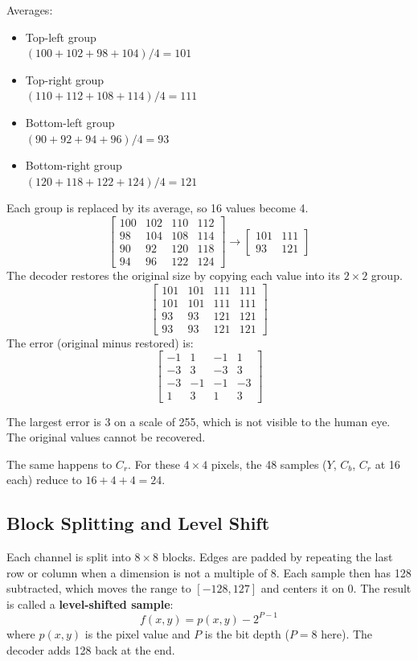 \documentclass[11pt,a4paper]{article}
\begin{document}
Averages:
\begin{itemize}
\item Top-left group\\
  $(100+102+98+104)/4=101$
\item Top-right group\\
  $(110+112+108+114)/4=111$
\item Bottom-left group\\
  $(90+92+94+96)/4=93$
\item Bottom-right group\\
  $(120+118+122+124)/4=121$
\end{itemize}
Each group is replaced by its average, so 16 values become 4.
\[
\begin{bmatrix}
100&102&110&112\\
 98&104&108&114\\
 90& 92&120&118\\
 94& 96&122&124
\end{bmatrix}
\longrightarrow
\begin{bmatrix}
101&111\\
 93&121
\end{bmatrix}
\]
The decoder restores the original size by copying each value into its $2\times2$ group.
\[
\begin{bmatrix}
101&101&111&111\\
101&101&111&111\\
 93& 93&121&121\\
 93& 93&121&121
\end{bmatrix}
\]
The error (original minus restored) is:
\[
\begin{bmatrix}
-1& 1&-1& 1\\
-3& 3&-3& 3\\
-3&-1&-1&-3\\
 1& 3& 1& 3
\end{bmatrix}
\]

The largest error is 3 on a scale of 255, which is not visible to the human eye. The original values cannot be recovered.

The same happens to $C_r$. For these $4\times4$ pixels, the 48 samples ($Y$, $C_b$, $C_r$ at 16 each) reduce to $16+4+4=24$.

\subsection{Block Splitting and Level Shift}

Each channel is split into $8\times8$ blocks. Edges are padded by repeating the last row or column when a dimension is not a multiple of 8. Each sample then has 128 subtracted, which moves the range to $[-128, 127]$ and centers it on 0. The result is called a \textbf{level-shifted sample}:
\[
f(x,y)=p(x,y)-2^{P-1}
\]
where $p(x,y)$ is the pixel value and $P$ is the bit depth ($P=8$ here). The decoder adds 128 back at the end.
\end{document}
